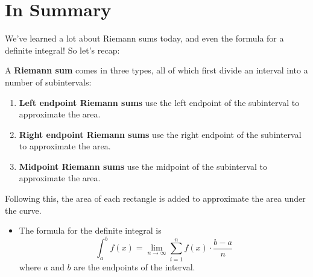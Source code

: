 \documentclass{ximera}
\begin{document}
\section{In Summary}
We've learned a lot about Riemann sums today, and even the formula for a definite integral! So let's recap:
\begin{definition}
A \textbf{Riemann sum} comes in three types, all of which first divide an interval into a number of subintervals:
\begin{enumerate}
\item{\textbf{Left endpoint Riemann sums} use the left endpoint of the subinterval to approximate the area.}
\item{\textbf{Right endpoint Riemann sums} use the right endpoint of the subinterval to approximate the area.}
\item{\textbf{Midpoint Riemann sums} use the midpoint of the subinterval to approximate the area.}
\end{enumerate}
Following this, the area of each rectangle is added to approximate the area under the curve.
\end{definition}

\begin{itemize}
\item{The formula for the definite integral is $$\displaystyle \int_a^b f(x) = \lim_{n\to\infty} \sum_{i=1}^n f(x) \cdot \frac{b-a}{n}$$where $a$ and $b$ are the endpoints of the interval.}
\end{itemize}
\pagebreak
\end{document}
